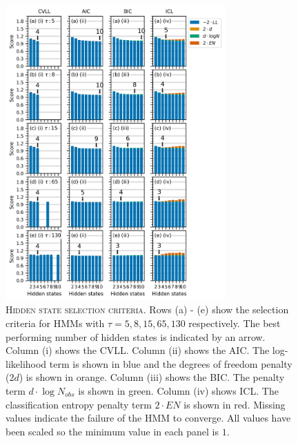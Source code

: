 \begin{figure}
    \centering
    \includegraphics[width=0.75\textwidth]{chapters/hmm_selection/figures/prinz_h_state_selection.png}
    \caption[Hidden state selection criteria]{\textsc{Hidden state selection criteria}. Rows (a) - (e) show the selection criteria for HMMs with $\tau=5, 8, 15, 65, 130$ respectively. The best performing number of hidden states is indicated by an arrow. Column (i) shows the CVLL. Column (ii) shows the AIC. The log-likelihood term is shown in blue and the degrees of freedom penalty ($2d$) is shown in orange. Column (iii) shows the BIC. The penalty term $d\cdot\log{N_{obs}}$ is shown in green.  Column (iv) shows ICL. The classification entropy penalty term $2\cdot EN$ is shown in red. Missing values indicate the failure of the HMM to converge. All values have been scaled so the minimum value in each panel is $1$.}
    \label{fig:prinz_criteria_results}
\end{figure}

